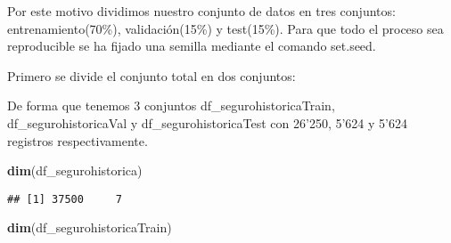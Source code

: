 \documentclass[]{article}
\newenvironment{Shaded}{\begin{snugshade}}{\end{snugshade}}
\newcommand{\KeywordTok}[1]{\textcolor[rgb]{0.13,0.29,0.53}{\textbf{#1}}}
\newcommand{\DataTypeTok}[1]{\textcolor[rgb]{0.13,0.29,0.53}{#1}}
\newcommand{\DecValTok}[1]{\textcolor[rgb]{0.00,0.00,0.81}{#1}}
\newcommand{\StringTok}[1]{\textcolor[rgb]{0.31,0.60,0.02}{#1}}
\newcommand{\OtherTok}[1]{\textcolor[rgb]{0.56,0.35,0.01}{#1}}
\newcommand{\OperatorTok}[1]{\textcolor[rgb]{0.81,0.36,0.00}{\textbf{#1}}}
\newcommand{\NormalTok}[1]{#1}
\begin{document}
Por este motivo dividimos nuestro conjunto de datos en tres conjuntos:
entrenamiento(70\%), validación(15\%) y test(15\%). Para que todo el
proceso sea reproducible se ha fijado una semilla mediante el comando
set.seed.

Primero se divide el conjunto total en dos conjuntos:

\begin{Shaded}
\end{Shaded}

De forma que tenemos 3 conjuntos df\_segurohistoricaTrain,
df\_segurohistoricaVal y df\_segurohistoricaTest con 26'250, 5'624 y
5'624 registros respectivamente.

\begin{Shaded}
\begin{Highlighting}[]
\KeywordTok{dim}\NormalTok{(df_segurohistorica)}
\end{Highlighting}
\end{Shaded}

\begin{verbatim}
## [1] 37500     7
\end{verbatim}

\begin{Shaded}
\begin{Highlighting}[]
\KeywordTok{dim}\NormalTok{(df_segurohistoricaTrain)}
\end{Highlighting}
\end{Shaded}
\end{document}
